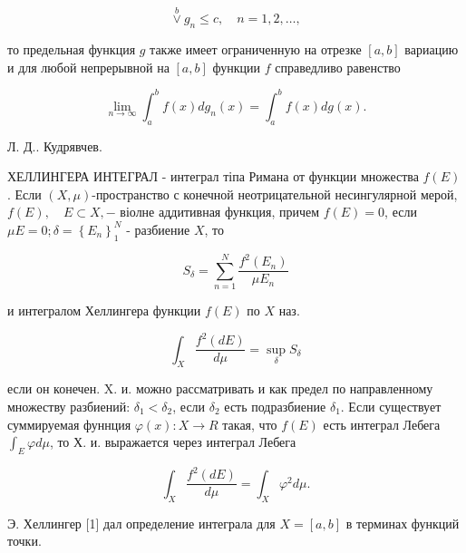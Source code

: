 \documentclass[10pt]{article}
\begin{document}
\[

\stackrel{b}{\vee} g_{n} \leqslant c, \quad n=1,2, \ldots,

\]



то предельная функция $g$ также имеет ограниченную на отрезке $[a, b]$ вариацию и для любой непрерывной на $[a, b]$ функции $f$ справедливо равенство



\[

\lim _{n \rightarrow \infty} \int_{a}^{b} f(x) d g_{n}(x)=\int_{a}^{b} f(x) d g(x) .

\]



Л. Д.. Кудрявчев.



ХЕЛЛИНГЕРА ИНТЕГРАЛ - интеграл тіпа Римана от функции множества $f(E)$. Если $(X, \mu)$-пространство с конечной неотрицательной несингулярной мерой, $f(E), \quad E \subset X,-$ віолне аддитивная функция, причем $f(E)=0$, если $\mu E=0 ; \delta=\left\{E_{n}\right\}_{1}^{N}$ - разбиение $X$, то



\[

S_{\delta}=\sum_{n=1}^{N} \frac{f^{2}\left(E_{n}\right)}{\mu E_{n}}

\]



и интегралом Хеллингера функции $f(E)$ по $X$ наз.



\[

\int_{X} \frac{f^{2}(d E)}{d \mu}=\sup _{\delta} S_{\delta}

\]



если он конечен. X. и. можно рассматривать и как предел по направленному множеству разбиений: $\delta_{1}<\delta_{2}$, если $\delta_{2}$ есть подразбиение $\delta_{1}$. Если существует суммируемая фуннция $\varphi(x): X \rightarrow R$ такая, что $f(E)$ есть интеграл Лебега $\int_{E} \varphi d \mu$, то Х. и. выражается через интеграл Лебега



\[

\int_{X} \frac{f^{2}(d E)}{d \mu}=\int_{X} \varphi^{2} d \mu .

\]



Э. Хеллингер [1] дал определение интеграла для $X=[a, b]$ в терминах функций точки.
\end{document}
